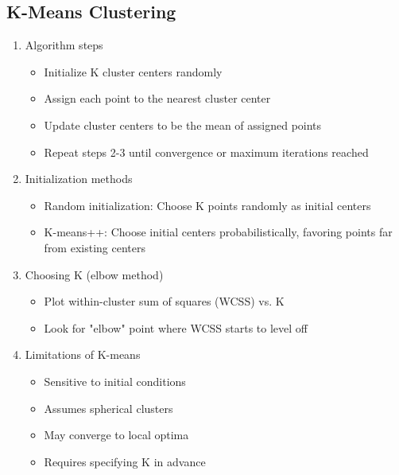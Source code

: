 \documentclass{article}
\begin{document}
\subsection{K-Means Clustering}
\begin{enumerate}
    \item Algorithm steps
    \begin{itemize}
        \item Initialize K cluster centers randomly
        \item Assign each point to the nearest cluster center
        \item Update cluster centers to be the mean of assigned points
        \item Repeat steps 2-3 until convergence or maximum iterations reached
    \end{itemize}
    
    \item Initialization methods
    \begin{itemize}
        \item Random initialization: Choose K points randomly as initial centers
        \item K-means++: Choose initial centers probabilistically, favoring points far from existing centers
    \end{itemize}
    
    \item Choosing K (elbow method)
    \begin{itemize}
        \item Plot within-cluster sum of squares (WCSS) vs. K
        \item Look for "elbow" point where WCSS starts to level off
    \end{itemize}
    
    \item Limitations of K-means
    \begin{itemize}
        \item Sensitive to initial conditions
        \item Assumes spherical clusters
        \item May converge to local optima
        \item Requires specifying K in advance
    \end{itemize}
\end{enumerate}
\end{document}
